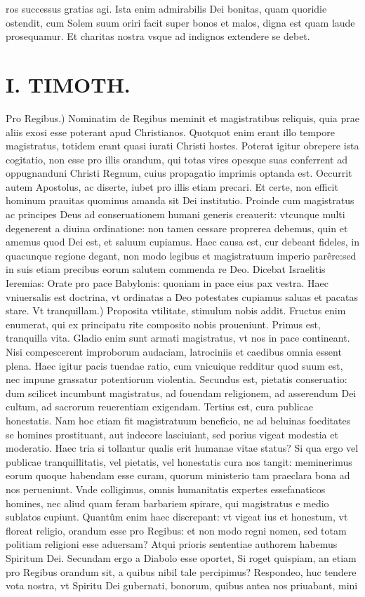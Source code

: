 \documentclass{article}
\begin{document}
\begin{pages}
ros successus gratias agi. Ista enim admirabilis Dei bonitas, quam quoridie ostendit, cum Solem suum oriri facit super bonos et malos, digna est quam laude prosequamur. Et charitas nostra vsque ad indignos extendere se debet.  \pend
\section*{I. TIMOTH. }
\marginpar{[ p.18 ]}\pstart Pro Regibus.) Nominatim de Regibus meminit et magistratibus reliquis, quia prae aliis exosi esse poterant apud Christianos. Quotquot enim erant illo tempore magistratus, totidem erant quasi iurati Christi hostes. Poterat igitur obrepere ista cogitatio, non esse pro illis orandum, qui totas vires opesque suas conferrent ad oppugnanduni Christi Regnum, cuius propagatio imprimis optanda est. Occurrit autem Apostolus, ac diserte, iubet pro illis etiam precari. Et certe, non efficit hominum prauitas quominus amanda sit Dei institutio. Proinde cum magistratus ac principes Deus ad conseruationem humani generis creauerit: vtcunque multi degenerent a diuina ordinatione: non tamen cessare proprerea debemus, quin et amemus quod Dei est, et saluum cupiamus. Haec causa est, cur debeant fideles, in quacunque regione degant, non modo legibus et magistratuum imperio parêre:sed in suis etiam precibus eorum salutem commenda re Deo. Dicebat Israelitis Ieremias: Orate pro pace Babylonis: quoniam in pace eius pax vestra. Haec vniuersalis est doctrina, vt ordinatas a Deo potestates cupiamus saluas et pacatas stare.  \pend\pstart Vt tranquillam.) Proposita vtilitate, stimulum nobis addit. Fructus enim enumerat, qui ex principatu rite composito nobis proueniunt. Primus est, tranquilla vita. Gladio enim sunt armati magistratus, vt nos in pace contineant. Nisi compescerent improborum audaciam, latrociniis et caedibus omnia essent plena. Haec igitur pacis tuendae ratio, cum vnicuique redditur quod suum est, nec impune grassatur potentiorum violentia. Secundus est, pietatis conseruatio: dum scilicet incumbunt magistratus, ad fouendam religionem, ad asserendum Dei cultum, ad sacrorum reuerentiam exigendam. Tertius est, cura publicae honestatis. Nam hoc etiam fit magistratuum beneficio, ne ad beluinas foeditates se homines prostituant, aut indecore lasciuiant, sed porius vigeat modestia et moderatio. Haec tria si tollantur qualis erit humanae vitae status? Si qua ergo vel publicae tranquillitatis, vel pietatis, vel honestatis cura nos tangit: meminerimus eorum quoque habendam esse curam, quorum ministerio tam praeclara bona ad nos perueniunt. Vnde colligimus, omnis humanitatis expertes essefanaticos homines, nec aliud quam feram barbariem spirare, qui magistratus e medio sublatos cupiunt. Quantûm enim haec discrepant: vt vigeat ius et honestum, vt floreat religio, orandum esse pro Regibus: et non modo regni nomen, sed totam politiam religioni esse aduersam? Atqui prioris sententiae authorem habemus Spiritum Dei. Secundam ergo a Diabolo esse oportet, Si roget quispiam, an etiam pro Regibus orandum sit, a quibus nibil tale percipimus? Respondeo, huc tendere vota nostra, vt Spiritu Dei gubernati, bonorum, quibus antea nos priuabant, mini\pend

\end{pages}
\end{document}
